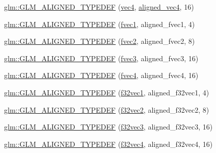 \begin{DoxyCompactItemize}
\item 
\hyperlink{group__gtx__type__aligned_ga12fe7b9769c964c5b48dcfd8b7f40198}{glm\+::\+G\+L\+M\+\_\+\+A\+L\+I\+G\+N\+E\+D\+\_\+\+T\+Y\+P\+E\+D\+EF} (\hyperlink{group__core__types_ga5881b1b022d7fd1b7218f5916532dd02}{vec4}, \hyperlink{group__gtc__type__aligned_gad26d520694d7b865507819c2d9f2b196}{aligned\+\_\+vec4}, 16)
\item 
\hyperlink{group__gtx__type__aligned_gaefab04611c7f8fe1fd9be3071efea6cc}{glm\+::\+G\+L\+M\+\_\+\+A\+L\+I\+G\+N\+E\+D\+\_\+\+T\+Y\+P\+E\+D\+EF} (\hyperlink{group__gtc__type__precision_gaed54853d0f184df0e5fbd9f9118c477b}{fvec1}, aligned\+\_\+fvec1, 4)
\item 
\hyperlink{group__gtx__type__aligned_ga2543c05ba19b3bd19d45b1227390c5b4}{glm\+::\+G\+L\+M\+\_\+\+A\+L\+I\+G\+N\+E\+D\+\_\+\+T\+Y\+P\+E\+D\+EF} (\hyperlink{group__gtc__type__precision_gaabc3d7a259968a12108c052ff9265148}{fvec2}, aligned\+\_\+fvec2, 8)
\item 
\hyperlink{group__gtx__type__aligned_ga009afd727fd657ef33a18754d6d28f60}{glm\+::\+G\+L\+M\+\_\+\+A\+L\+I\+G\+N\+E\+D\+\_\+\+T\+Y\+P\+E\+D\+EF} (\hyperlink{group__gtc__type__precision_gaf7cdc93898ec0c11f1cff54bd72d022b}{fvec3}, aligned\+\_\+fvec3, 16)
\item 
\hyperlink{group__gtx__type__aligned_ga2f26177e74bfb301a3d0e02ec3c3ef53}{glm\+::\+G\+L\+M\+\_\+\+A\+L\+I\+G\+N\+E\+D\+\_\+\+T\+Y\+P\+E\+D\+EF} (\hyperlink{group__gtc__type__precision_ga0319cdd208269c180e326b243e2e84e4}{fvec4}, aligned\+\_\+fvec4, 16)
\item 
\hyperlink{group__gtx__type__aligned_ga309f495a1d6b75ddf195b674b65cb1e4}{glm\+::\+G\+L\+M\+\_\+\+A\+L\+I\+G\+N\+E\+D\+\_\+\+T\+Y\+P\+E\+D\+EF} (\hyperlink{group__gtc__type__precision_ga27d40e360fd5b6ad39ca34ded8210b53}{f32vec1}, aligned\+\_\+f32vec1, 4)
\item 
\hyperlink{group__gtx__type__aligned_ga5e185865a2217d0cd47187644683a8c3}{glm\+::\+G\+L\+M\+\_\+\+A\+L\+I\+G\+N\+E\+D\+\_\+\+T\+Y\+P\+E\+D\+EF} (\hyperlink{group__gtc__type__precision_gaeb896022a9c59e8c3c4ce627c66c9262}{f32vec2}, aligned\+\_\+f32vec2, 8)
\item 
\hyperlink{group__gtx__type__aligned_gade4458b27b039b9ca34f8ec049f3115a}{glm\+::\+G\+L\+M\+\_\+\+A\+L\+I\+G\+N\+E\+D\+\_\+\+T\+Y\+P\+E\+D\+EF} (\hyperlink{group__gtc__type__precision_ga4d08db2a75d1e8f85e0edbbd76f18ecf}{f32vec3}, aligned\+\_\+f32vec3, 16)
\item 
\hyperlink{group__gtx__type__aligned_ga2e8a12c5e6a9c4ae4ddaeda1d1cffe3b}{glm\+::\+G\+L\+M\+\_\+\+A\+L\+I\+G\+N\+E\+D\+\_\+\+T\+Y\+P\+E\+D\+EF} (\hyperlink{group__gtc__type__precision_ga03e165a8b1ffe77625530fa335699e06}{f32vec4}, aligned\+\_\+f32vec4, 16)

\end{DoxyCompactItemize}

